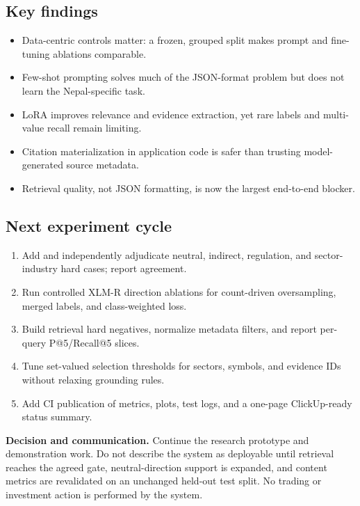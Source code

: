 \documentclass[10pt,a4paper]{article}
\begin{document}
\begin{minipage}[t]{0.48\textwidth}
\raggedright
\subsection{Key findings}
\begin{itemize}
  \item Data-centric controls matter: a frozen, grouped split makes prompt and fine-tuning ablations comparable.
  \item Few-shot prompting solves much of the JSON-format problem but does not learn the Nepal-specific task.
  \item LoRA improves relevance and evidence extraction, yet rare labels and multi-value recall remain limiting.
  \item Citation materialization in application code is safer than trusting model-generated source metadata.
  \item Retrieval quality, not JSON formatting, is now the largest end-to-end blocker.
\end{itemize}
\end{minipage}\hfill
\begin{minipage}[t]{0.48\textwidth}
\raggedright
\subsection{Next experiment cycle}
\begin{enumerate}
  \item Add and independently adjudicate neutral, indirect, regulation, and sector-industry hard cases; report agreement.
  \item Run controlled XLM-R direction ablations for count-driven oversampling, merged labels, and class-weighted loss.
  \item Build retrieval hard negatives, normalize metadata filters, and report per-query P@5/Recall@5 slices.
  \item Tune set-valued selection thresholds for sectors, symbols, and evidence IDs without relaxing grounding rules.
  \item Add CI publication of metrics, plots, test logs, and a one-page ClickUp-ready status summary.
\end{enumerate}
\end{minipage}

\vspace{0.75em}
\textbf{Decision and communication.} Continue the research prototype and demonstration work. Do not
describe the system as deployable until retrieval reaches the agreed gate, neutral-direction support
is expanded, and content metrics are revalidated on an unchanged held-out test split. No trading or
investment action is performed by the system.
\end{document}
